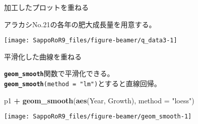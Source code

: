\documentclass[ignorenonframetext,]{beamer}
\newenvironment{Shaded}{\begin{snugshade}}{\end{snugshade}}
\newcommand{\KeywordTok}[1]{\textcolor[rgb]{0.13,0.29,0.53}{\textbf{#1}}}
\newcommand{\DataTypeTok}[1]{\textcolor[rgb]{0.13,0.29,0.53}{#1}}
\newcommand{\DecValTok}[1]{\textcolor[rgb]{0.00,0.00,0.81}{#1}}
\newcommand{\StringTok}[1]{\textcolor[rgb]{0.31,0.60,0.02}{#1}}
\newcommand{\OperatorTok}[1]{\textcolor[rgb]{0.81,0.36,0.00}{\textbf{#1}}}
\newcommand{\NormalTok}[1]{#1}
\let\oldShaded\Shaded
\let\endoldShaded\endShaded
\renewenvironment{Shaded}{\footnotesize\oldShaded}{\endoldShaded}
\begin{document}
\begin{frame}[fragile]{加工したプロットを重ねる}

アラカシNo.21の各年の肥大成長量を用意する。

\begin{Shaded}
\end{Shaded}

\texttt{[image: SappoRoR9\_files/figure-beamer/q\_data3-1]}

\end{frame}

\begin{frame}[fragile]{平滑化した曲線を重ねる}

\textbf{\texttt{geom\_smooth}}関数で平滑化できる。\\
\textbf{\texttt{geom\_smooth}}\texttt{(method\ =\ "lm")}とすると直線回帰。

\begin{Shaded}
\begin{Highlighting}[]
\NormalTok{p1 }\OperatorTok{+}\StringTok{ }\KeywordTok{geom_smooth}\NormalTok{(}\KeywordTok{aes}\NormalTok{(Year, Growth), }\DataTypeTok{method =} \StringTok{"loess"}\NormalTok{)}
\end{Highlighting}
\end{Shaded}

\texttt{[image: SappoRoR9\_files/figure-beamer/geom\_smooth-1]}

\end{frame}
\end{document}
